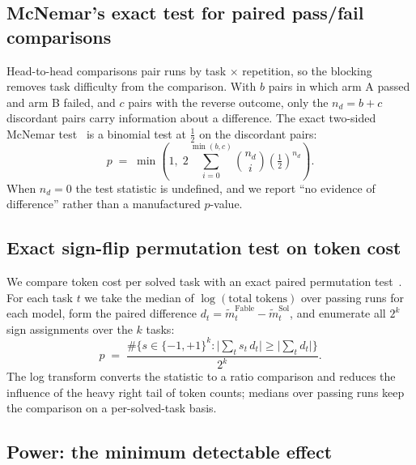 \documentclass[11pt]{article}
\begin{document}
\subsection{McNemar's exact test for paired pass/fail comparisons}

Head-to-head comparisons pair runs by task $\times$ repetition, so the
blocking removes task difficulty from the comparison. With $b$ pairs in
which arm A passed and arm B failed, and $c$ pairs with the reverse
outcome, only the $n_d = b + c$ discordant pairs carry information about a
difference. The exact two-sided McNemar test~\cite{mcnemar1947} is a
binomial test at $\tfrac12$ on the discordant pairs:
%
\begin{equation}
p \;=\; \min\!\left(1,\;
2 \sum_{i=0}^{\min(b,c)} \binom{n_d}{i} \left(\tfrac{1}{2}\right)^{n_d}
\right).
\label{eq:mcnemar}
\end{equation}
%
When $n_d = 0$ the test statistic is undefined, and we report ``no evidence
of difference'' rather than a manufactured $p$-value.

\subsection{Exact sign-flip permutation test on token cost}

We compare token cost per solved task with an exact paired permutation
test~\cite{fisher1935}. For each task $t$ we take the median of
$\log(\text{total tokens})$ over passing runs for each model, form the
paired difference $d_t = \tilde m^{\text{Fable}}_t - \tilde m^{\text{Sol}}_t$,
and enumerate all $2^k$ sign assignments over the $k$ tasks:
%
\begin{equation}
p \;=\; \frac{\#\bigl\{ s \in \{-1,+1\}^k :
\bigl|\sum_{t} s_t\, d_t \bigr| \ge \bigl|\sum_{t} d_t\bigr| \bigr\}}{2^k}.
\label{eq:permutation}
\end{equation}
%
The log transform converts the statistic to a ratio comparison and reduces
the influence of the heavy right tail of token counts; medians over passing
runs keep the comparison on a per-solved-task basis.

\subsection{Power: the minimum detectable effect}
\label{sec:power}
\end{document}
